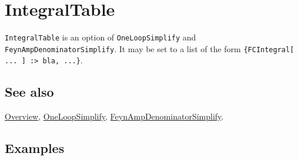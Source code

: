 \documentclass[../FeynCalcManual.tex]{subfiles}
\begin{document}
\begin{Shaded}
\begin{Highlighting}[]
 
\end{Highlighting}
\end{Shaded}

\hypertarget{integraltable}{
\section{IntegralTable}\label{integraltable}}

\texttt{IntegralTable} is an option of \texttt{OneLoopSimplify} and
\texttt{FeynAmpDenominatorSimplify}. It may be set to a list of the form
\texttt{\{\allowbreak{}FCIntegral[\allowbreak{} ... ] :> bla,\ \allowbreak{}...\}}.

\subsection{See also}

\hyperlink{toc}{Overview}, \hyperlink{oneloopsimplify}{OneLoopSimplify},
\hyperlink{feynampdenominatorsimplify}{FeynAmpDenominatorSimplify}.

\subsection{Examples}
\end{document}
